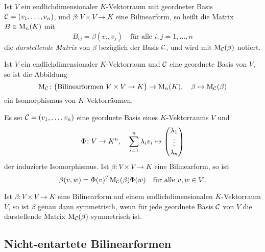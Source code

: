 \begin{definition}
  Ist $V$ ein endlichdimensionaler $K$-Vektorraum mit geordneter Basis $\mathcal{C} = (v_1, \dotsc, v_n)$, und $\beta \colon V \times V \to K$ eine Bilinearform, so heißt die Matrix $B \in \mathrm{M}_n(K)$ mit
  \[
    B_{ij} = \beta(v_i, v_j)
    \quad
    \text{für alle $i,j = 1, \dotsc, n$}
  \]
  die \emph{darstellende Matrix} von $\beta$ bezüglich der Basis $\mathcal{C}$, und wird mit $\mathrm{M}_{\mathcal{C}}(\beta)$ notiert.
\end{definition}


\begin{lemma}
  Ist $V$ ein endlichdimensionaler $K$-Vektorraum und $\mathcal{C}$ eine geordnete Basis von $V$, so ist die Abbildung
  \[
    \mathrm{M}_{\mathcal{C}}
    \colon
    \{\text{Bilinearformen $V \times V \to K$}\}
    \to
    \mathrm{M}_n(K),
    \quad
    \beta
    \mapsto
    \mathrm{M}_{\mathcal{C}}(\beta)
  \]
  ein Isomorphismus von $K$-Vektorräumen.
\end{lemma}


\begin{lemma}
  Es sei $\mathcal{C} = (v_1, \dotsc, v_n)$ eine geordnete Basis eines $K$-Vektorraums $V$ und
  \[
    \Phi \colon V \to K^n,
    \quad
    \sum_{i=1}^n \lambda_i v_i \mapsto \begin{pmatrix} \lambda_1 \\ \vdots \\ \lambda_n \end{pmatrix}
  \]
  der induzierte Isomorphismus.
  Ist $\beta \colon V \times V \to K$ eine Bilinearform, so ist
  \[
    \beta(v,w)
    =
    \Phi(v)^T \mathrm{M}_{\mathcal{C}}(\beta) \Phi(w)
    \quad
    \text{für alle $v, w \in V$}.
  \]
\end{lemma}


\begin{corollary}
  Ist $\beta \colon V \times V \to K$ eine Bilinearform auf einem endlichdimensionalen $K$-Vektorraum $V$, so ist $\beta$ genau dann symmetrisch, wenn für jede geordnete Basis $\mathcal{C}$ von $V$ die darstellende Matrix $\mathrm{M}_{\mathcal{C}}(\beta)$ symmetrisch ist.
\end{corollary}












\subsection{Nicht-entartete Bilinearformen}


